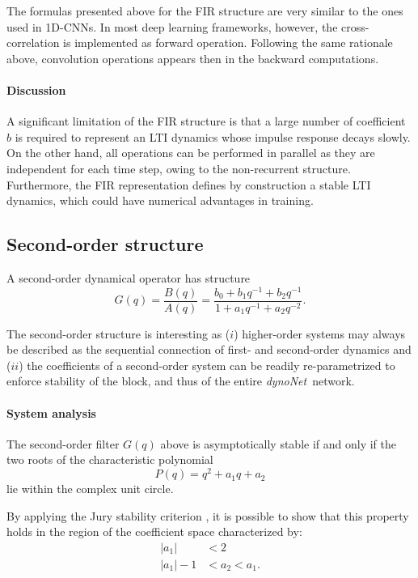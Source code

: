\documentclass{article}
\newcommand{\q}{q} %
\newcommand{\A}{A} %
\newcommand{\ac}{a} %
\newcommand{\bb}{b} %
\newcommand{\Name}{\emph{dynoNet}}
\begin{document}
The formulas presented above for the FIR structure are very similar to the ones used in 1D-CNNs. In most deep learning frameworks, however, the cross-correlation is implemented as forward operation. 
Following the same rationale above, convolution operations appears then in the backward computations.

\paragraph{Discussion}
A significant limitation of the FIR structure is that a large number of coefficient $\bb$ is required to represent an LTI dynamics whose impulse response decays slowly.
On the other hand, all operations can be performed in parallel as they are independent for each time step, owing to the non-recurrent structure. Furthermore, the FIR representation defines by construction a stable LTI dynamics, which could have numerical advantages in training.



\subsection{Second-order structure}
A second-order dynamical operator has structure
\begin{equation}
G(\q) =  \frac{B(\q)}{\A(\q)} = \frac{b_0 + b_1\q^{-1} + b_2\q^{-1}}{1 + \ac_1\q^{-1} + \ac_2\q^{-2}}.
\end{equation}

The second-order structure is interesting as ($i$) higher-order systems may always be described as the sequential connection of first- and second-order dynamics and ($ii$) the coefficients of a second-order system can be readily re-parametrized  to  enforce stability of the block, and thus of the entire \Name\ network.   

\paragraph{System analysis}
The second-order filter $G(\q)$ above is asymptotically stable if and only if the two roots of the characteristic polynomial
\begin{equation}
P(\q) = \q^2 + \ac_1 \q + \ac_2
\end{equation}
lie within the complex unit circle. 

By applying the Jury stability criterion \cite{ogata1995discrete}, it is possible to show that this property holds in the region of the coefficient space characterized by:
\begin{subequations}
	\label{eq:jury}
	\begin{align}
	|\ac_1| &< 2\\
	|{\ac_1}| - 1 &< \ac_2 < \ac_1.
	\end{align}
\end{subequations}
\end{document}
